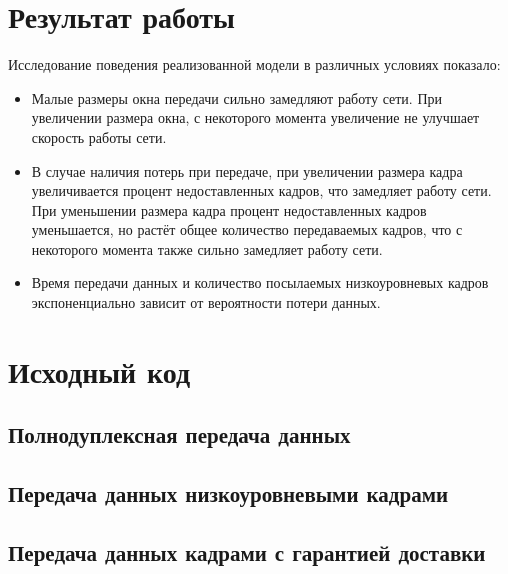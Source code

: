 \documentclass[a4paper,10pt]{article}
\begin{document}
\section{Результат работы}
Исследование поведения реализованной модели в различных условиях показало:
\begin{itemize}
  \item Малые размеры окна передачи сильно замедляют работу сети.
  При увеличении размера окна, 
  с некоторого момента увеличение не улучшает скорость работы сети.
  \item В случае наличия потерь при передаче, 
  при увеличении размера кадра увеличивается процент недоставленных кадров,
  что замедляет работу сети. 
  При уменьшении размера кадра процент недоставленных кадров уменьшается,
  но растёт общее количество передаваемых кадров, что с некоторого момента
  также сильно замедляет работу сети.
  \item Время передачи данных и количество посылаемых низкоуровневых кадров 
  экспоненциально зависит от вероятности потери данных.
\end{itemize}

\pagebreak

\appendix
\section{Исходный код}
\label{appendix:sources}


\subsection{Полнодуплексная передача данных}
\label{appendix:sources:duplex-link}

\subsection{Передача данных низкоуровневыми кадрами}
\label{appendix:sources:frame}

\subsection{Передача данных кадрами с гарантией доставки}
\label{appendix:sources:sliding-window}


\pagebreak



\end{document}
